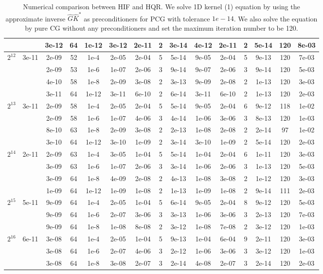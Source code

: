 \documentclass[11pt]{article}
\begin{document}
\begin{table}[!htbp]
\begin{tabular}{|c|c|c|c|c|c|c|c|c|c|c|c|c|c|c|}
~ & ~ & 3e-12 & 64 & 1e-12 & 3e-12 & 2e-11 & 2 & 3e-14 & 4e-12 & 2e-11 & 2 & 5e-14 & 120 & 8e-03\\
\hline
$2^{12}$ & 3e-11 & 2e-09 & 52 & 1e-4 & 2e-05 & 2e-04 & 5 & 5e-14 & 9e-05 & 2e-04 & 5 & 9e-13 & 120 & 7e-03\\
~ & ~ & 2e-09 & 53 & 1e-6 & 1e-07 & 2e-06 & 3 & 9e-14 & 9e-07 & 2e-06 & 3 & 9e-14 & 120 & 5e-03\\
~ & ~ & 4e-10 & 58 & 1e-8 & 2e-09 & 3e-08 & 2 & 3e-13 & 9e-09 & 2e-08 & 2 & 1e-13 & 120 & 3e-03\\
~ & ~ & 3e-11 & 64 & 1e-12 & 3e-11 & 6e-10 & 2 & 6e-14 & 3e-11 & 6e-10 & 2 & 1e-13 & 120 & 2e-03\\
\hline
$2^{13}$ & 3e-11 & 2e-09 & 58 & 1e-4 & 2e-05 & 2e-04 & 5 & 5e-14 & 9e-05 & 2e-04 & 6 & 9e-12 & 118 & 1e-02\\
~ & ~ & 2e-09 & 58 & 1e-6 & 1e-07 & 4e-06 & 3 & 4e-14 & 1e-06 & 3e-06 & 3 & 8e-13 & 120 & 1e-03\\
~ & ~ & 8e-10 & 63 & 1e-8 & 2e-09 & 3e-08 & 2 & 2e-13 & 1e-08 & 2e-08 & 2 & 2e-14 & 97 & 1e-02\\
~ & ~ & 3e-10 & 64 & 1e-12 & 3e-10 & 1e-09 & 2 & 3e-14 & 3e-10 & 1e-09 & 2 & 5e-14 & 120 & 2e-03\\
\hline
$2^{14}$ & 2e-11 & 2e-09 & 63 & 1e-4 & 3e-05 & 1e-04 & 5 & 5e-14 & 1e-04 & 2e-04 & 6 & 1e-11 & 120 & 3e-03\\
~ & ~ & 3e-09 & 63 & 1e-6 & 1e-07 & 2e-06 & 3 & 3e-14 & 1e-06 & 2e-06 & 3 & 1e-13 & 120 & 5e-03\\
~ & ~ & 3e-09 & 64 & 1e-8 & 4e-09 & 2e-08 & 2 & 4e-13 & 1e-08 & 3e-08 & 2 & 1e-12 & 120 & 3e-03\\
~ & ~ & 1e-09 & 64 & 1e-12 & 1e-09 & 1e-08 & 2 & 1e-13 & 1e-09 & 1e-08 & 2 & 9e-14 & 111 & 2e-03\\
\hline
$2^{15}$ & 5e-11 & 9e-09 & 64 & 1e-4 & 2e-05 & 1e-04 & 5 & 6e-14 & 9e-05 & 2e-04 & 8 & 9e-12 & 120 & 5e-03\\
~ & ~ & 9e-09 & 64 & 1e-6 & 2e-07 & 3e-06 & 3 & 3e-13 & 1e-06 & 3e-06 & 3 & 2e-13 & 120 & 7e-03\\
~ & ~ & 9e-09 & 64 & 1e-8 & 1e-08 & 8e-08 & 2 & 3e-12 & 1e-08 & 7e-08 & 2 & 3e-12 & 120 & 1e-03\\
\hline
$2^{16}$ & 6e-11 & 3e-08 & 64 & 1e-4 & 2e-05 & 1e-04 & 5 & 9e-13 & 1e-04 & 6e-04 & 9 & 2e-11 & 120 & 3e-03\\
~ & ~ & 3e-08 & 64 & 1e-6 & 2e-07 & 4e-06 & 3 & 2e-12 & 1e-06 & 3e-06 & 3 & 3e-12 & 120 & 1e-03\\
~ & ~ & 3e-08 & 64 & 1e-8 & 3e-08 & 2e-07 & 3 & 2e-14 & 4e-08 & 2e-07 & 3 & 2e-14 & 120 & 2e-03\\


\end{tabular}

\caption{Numerical comparison between HIF and HQR. We solve 1D kernel (1) equation by using the approximate inverse $\hat{G}\hat{K}^{*}$ as preconditioners for PCG with tolerance $1e-14$. We also solve the equation by pure CG without any preconditioners and set the maximum iteration number to be 120.}
\label{1d-k1}
\end{table}
\end{document}

